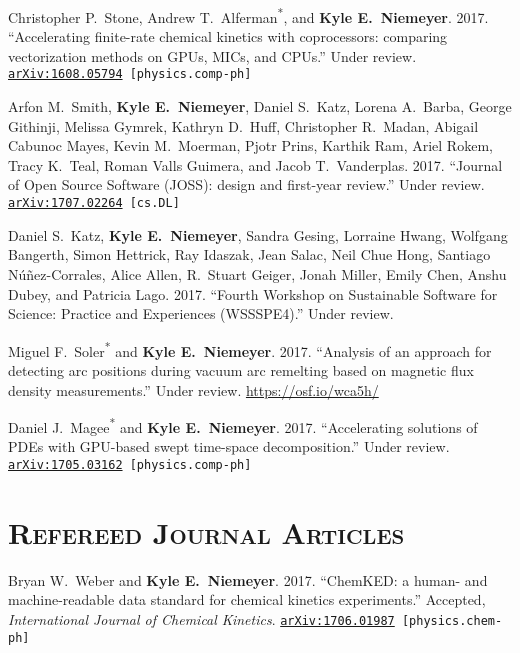 \documentclass[margin,line,11pt]{res}
\makeatletter
\newlength{\bibhang}
\newlength{\bibsep}
 {\@listi \global\bibsep\itemsep \global\advance\bibsep by\parsep}
\newenvironment{bibenum*}
  {\renewcommand\labelenumi{\theenumi.}%
   \etaremune[
     topsep=0pt,
     itemsep=\bibsep,
     parsep=0pt,partopsep=0pt,
     itemindent=-\bibhang,
     leftmargin={\bibhang+\widthof{[999]}}]}
  {\endetaremune}
\newcommand*{\grad}[0]{\textsuperscript{*}}
\makeatother
\begin{document}
\begin{resume}
\begin{bibenum*}
\item Christopher P.~Stone, Andrew T.~Alferman\grad{}, and \textbf{Kyle E.~Niemeyer}.
2017.
``Accelerating finite-rate chemical kinetics with coprocessors: comparing vectorization methods on GPUs, MICs, and CPUs.''
Under review. {\tt \href{https://arxiv.org/abs/1608.05794}{arXiv:1608.05794} [physics.comp-ph]}

\item Arfon M.~Smith, \textbf{Kyle E.~Niemeyer}, Daniel S.~Katz, Lorena A.~Barba,
George Githinji, Melissa Gymrek, Kathryn D.~Huff, Christopher R.~Madan,
Abigail Cabunoc Mayes, Kevin M.~Moerman, Pjotr Prins, Karthik Ram, Ariel Rokem,
Tracy K.~Teal, Roman Valls Guimera, and Jacob T.~Vanderplas.
2017.
``Journal of Open Source Software (JOSS): design and first-year review.''
Under review.
{\tt \href{https://arxiv.org/abs/1707.02264}{arXiv:1707.02264} [cs.DL]}


\item Daniel S.~Katz, \textbf{Kyle E.~Niemeyer}, Sandra Gesing, Lorraine Hwang,
Wolfgang Bangerth, Simon Hettrick, Ray Idaszak, Jean Salac, Neil Chue Hong,
Santiago N\'{u}\~{n}ez-Corrales, Alice Allen, R.~Stuart Geiger, Jonah Miller, Emily Chen,
Anshu Dubey, and Patricia Lago.
2017.
``Fourth Workshop on Sustainable Software for Science: Practice and Experiences (WSSSPE4).''
Under review.

\item Miguel F.~Soler\grad{} and \textbf{Kyle E.~Niemeyer}.
2017.
``Analysis of an approach for detecting arc positions during vacuum arc remelting based on magnetic flux density measurements.''
Under review.
\url{https://osf.io/wca5h/}

\item Daniel J.~Magee\grad{} and \textbf{Kyle E.~Niemeyer}.
2017.
``Accelerating solutions of PDEs with GPU-based swept time-space decomposition.''
Under review. {\tt \href{https://arxiv.org/abs/1705.03162}{arXiv:1705.03162} [physics.comp-ph]}

\end{bibenum*}

\section{\textsc{Refereed Journal Articles}}

\begin{bibenum*}

\item Bryan W.~Weber and \textbf{Kyle E.~Niemeyer}.
2017.
``ChemKED: a human- and machine-readable data standard for chemical kinetics experiments.''
Accepted, \textit{International Journal of Chemical Kinetics}. 
{\tt \href{https://arxiv.org/abs/1706.01987}{arXiv:1706.01987} [physics.chem-ph]}


\end{bibenum*}
\end{resume}
\end{document}
